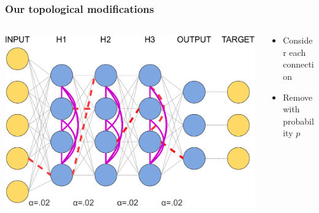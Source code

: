 \documentclass[pdf]{beamer}
\begin{document}
\begin{frame}
	\frametitle{Our topological modifications}
	\begin{columns}
		\begin{column}{.6\textwidth}
			\includegraphics[width=\textwidth]{figures/topology_changes_step3.pdf}
		\end{column}
		\begin{column}{.4\textwidth}
			\begin{itemize}
			\item Consider each connection
			\item Remove with probability $p$
			\end{itemize}
		\end{column}
	\end{columns}
\end{frame}
\end{document}
